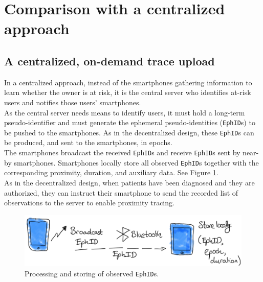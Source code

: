\documentclass[12pt,a4paper]{article}
\begin{document}
\section*{Comparison with a centralized approach}
\subsection*{A centralized, on-demand trace upload}
In a centralized approach, instead of the smartphones gathering information to learn whether the owner is at risk, it is the central server who identifies at-risk users and notifies those users' smartphones.\\[0.3cm]
As the central server needs means to identify users, it must hold a long-term
pseudo-identifier and must generate the ephemeral pseudo-identities (\texttt{EphID}s) to be pushed to the smartphones. As in the decentralized design, these \texttt{EphID}s can be produced, and sent to the smartphones, in epochs.\\[0.3cm]
The smartphones broadcast the received \texttt{EphID}s and receive \texttt{EphID}s sent by near-by smartphones. Smartphones locally store all observed \texttt{EphID}s together with the corresponding proximity, duration, and auxiliary data. See Figure \ref{ZZ}.\\[0.3cm]
As in the decentralized design, when patients have been diagnosed and they are authorized,
they can instruct their smartphone to send the recorded list of observations to the server to enable proximity tracing.
\begin{figure}[H]
\centering
\includegraphics[scale=0.4]{fig/ZZ}
\caption{Processing and storing of observed \texttt{EphID}s.}
\label{ZZ}
\end{figure}
\end{document}
